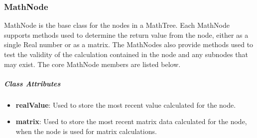 \subsubsection{MathNode}

MathNode is the base class for the nodes in a MathTree.  Each MathNode supports methods used to
determine the return value from the node, either as a single Real number or as a matrix.  The
MathNodes also provide methods used to test the validity of the calculation contained in the node
and any subnodes that may exist.  The core MathNode members are listed below.

\subparagraph{\textit{Class Attributes}}
\begin{itemize}
\item \textbf{realValue}: Used to store the most recent value calculated for the node.
\item \textbf{matrix}: Used to store the most recent matrix data calculated for the node, when the
node is used for matrix calculations.
\end{itemize}

